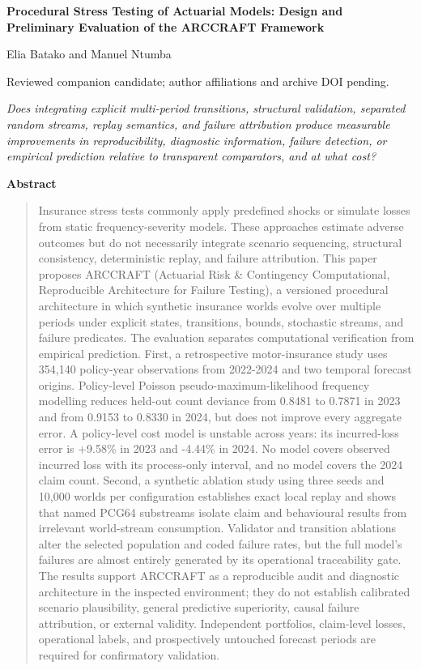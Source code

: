 \documentclass[12pt, letterpaper]{article}
\numberwithin{equation}{section}
\theoremstyle{plain}
\theoremstyle{definition}
\theoremstyle{remark}
\begin{document}
\thispagestyle{empty}
\vspace*{0.7cm}
{\centering
{\Large\bfseries Procedural Stress Testing of Actuarial Models: Design and Preliminary Evaluation of the ARCCRAFT Framework}\par
\vspace{0.5em}
{\large Elia Batako and Manuel Ntumba}\par
{\small Reviewed companion candidate; author affiliations and archive DOI pending.}\par
{\large\itshape Does integrating explicit multi-period transitions, structural validation, separated random streams, replay semantics, and failure attribution produce measurable improvements in reproducibility, diagnostic information, failure detection, or empirical prediction relative to transparent comparators, and at what cost?}\par
\par}
\vspace{0.8cm}
\begin{center}
\textbf{Abstract}
\end{center}
\begin{quote}
\small
Insurance stress tests commonly apply predefined shocks or simulate losses from static frequency-severity models. These approaches estimate adverse outcomes but do not necessarily integrate scenario sequencing, structural consistency, deterministic replay, and failure attribution. This paper proposes ARCCRAFT (Actuarial Risk \& Contingency Computational, Reproducible Architecture for Failure Testing), a versioned procedural architecture in which synthetic insurance worlds evolve over multiple periods under explicit states, transitions, bounds, stochastic streams, and failure predicates. The evaluation separates computational verification from empirical prediction. First, a retrospective motor-insurance study uses 354,140 policy-year observations from 2022-2024 and two temporal forecast origins. Policy-level Poisson pseudo-maximum-likelihood frequency modelling reduces held-out count deviance from 0.8481 to 0.7871 in 2023 and from 0.9153 to 0.8330 in 2024, but does not improve every aggregate error. A policy-level cost model is unstable across years: its incurred-loss error is +9.58\% in 2023 and -4.44\% in 2024. No model covers observed incurred loss with its process-only interval, and no model covers the 2024 claim count. Second, a synthetic ablation study using three seeds and 10,000 worlds per configuration establishes exact local replay and shows that named PCG64 substreams isolate claim and behavioural results from irrelevant world-stream consumption. Validator and transition ablations alter the selected population and coded failure rates, but the full model’s failures are almost entirely generated by its operational traceability gate. The results support ARCCRAFT as a reproducible audit and diagnostic architecture in the inspected environment; they do not establish calibrated scenario plausibility, general predictive superiority, causal failure attribution, or external validity. Independent portfolios, claim-level losses, operational labels, and prospectively untouched forecast periods are required for confirmatory validation.
\end{quote}
\end{document}
